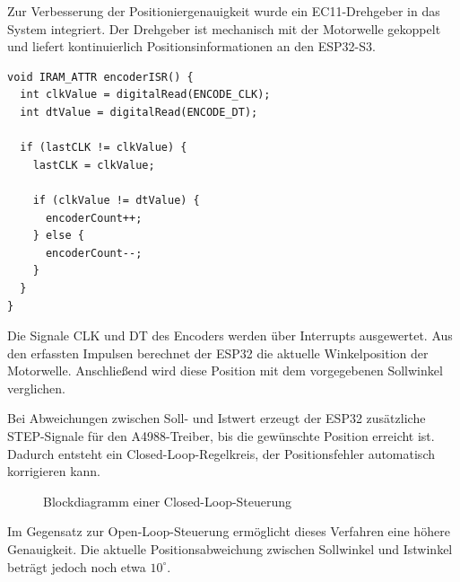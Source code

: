 \documentclass[a4paper,12pt]{article}
\begin{document}
Zur Verbesserung der Positioniergenauigkeit wurde ein EC11-Drehgeber in das System integriert. Der Drehgeber ist mechanisch mit der Motorwelle gekoppelt und liefert kontinuierlich Positionsinformationen an den ESP32-S3.

\begin{verbatim}
void IRAM_ATTR encoderISR() {
  int clkValue = digitalRead(ENCODE_CLK);
  int dtValue = digitalRead(ENCODE_DT);

  if (lastCLK != clkValue) {
    lastCLK = clkValue;

    if (clkValue != dtValue) {
      encoderCount++;
    } else {
      encoderCount--;
    }
  }
}
\end{verbatim}

Die Signale CLK und DT des Encoders werden über Interrupts ausgewertet. Aus den erfassten Impulsen berechnet der ESP32 die aktuelle Winkelposition der Motorwelle. Anschließend wird diese Position mit dem vorgegebenen Sollwinkel verglichen.

Bei Abweichungen zwischen Soll- und Istwert erzeugt der ESP32 zusätzliche STEP-Signale für den A4988-Treiber, bis die gewünschte Position erreicht ist. Dadurch entsteht ein Closed-Loop-Regelkreis, der Positionsfehler automatisch korrigieren kann.


\begin{figure}[H]
\centering


\caption{Blockdiagramm einer Closed-Loop-Steuerung}
\end{figure}


Im Gegensatz zur Open-Loop-Steuerung ermöglicht dieses Verfahren eine höhere Genauigkeit. Die aktuelle Positionsabweichung zwischen Sollwinkel und Istwinkel beträgt jedoch noch etwa \(10^\circ\).
\end{document}
